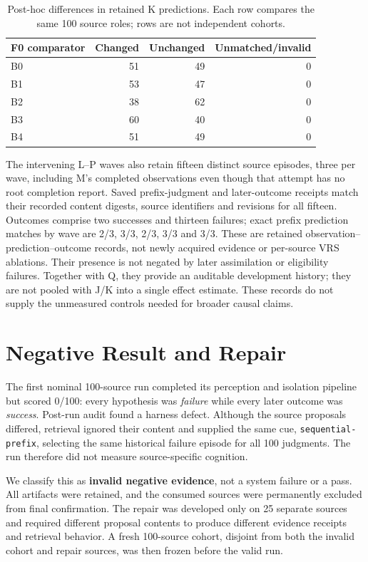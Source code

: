 \documentclass[11pt]{article}
\begin{document}
\begin{table}[ht]
\centering
\caption{Post-hoc differences in retained K predictions. Each row compares the same 100 source roles; rows are not independent cohorts.}
\label{tab:retained-k-changes}
\begin{tabular}{lrrr}
\toprule
F0 comparator & Changed & Unchanged & Unmatched/invalid \\
\midrule
B0 & 51 & 49 & 0 \\
B1 & 53 & 47 & 0 \\
B2 & 38 & 62 & 0 \\
B3 & 60 & 40 & 0 \\
B4 & 51 & 49 & 0 \\
\bottomrule
\end{tabular}
\end{table}

The intervening L--P waves also retain fifteen distinct source episodes, three per wave, including M's completed observations even though that attempt has no root completion report. Saved prefix-judgment and later-outcome receipts match their recorded content digests, source identifiers and revisions for all fifteen. Outcomes comprise two successes and thirteen failures; exact prefix prediction matches by wave are 2/3, 3/3, 2/3, 3/3 and 3/3. These are retained observation--prediction--outcome records, not newly acquired evidence or per-source VRS ablations. Their presence is not negated by later assimilation or eligibility failures. Together with Q, they provide an auditable development history; they are not pooled with J/K into a single effect estimate. These records do not supply the unmeasured controls needed for broader causal claims.

\section{Negative Result and Repair}

The first nominal 100-source run completed its perception and isolation pipeline but scored 0/100: every hypothesis was \emph{failure} while every later outcome was \emph{success}.  Post-run audit found a harness defect.  Although the source proposals differed, retrieval ignored their content and supplied the same cue, \texttt{sequential-prefix}, selecting the same historical failure episode for all 100 judgments.  The run therefore did not measure source-specific cognition.

We classify this as \textbf{invalid negative evidence}, not a system failure or a pass.  All artifacts were retained, and the consumed sources were permanently excluded from final confirmation.  The repair was developed only on 25 separate sources and required different proposal contents to produce different evidence receipts and retrieval behavior.  A fresh 100-source cohort, disjoint from both the invalid cohort and repair sources, was then frozen before the valid run.
\end{document}
